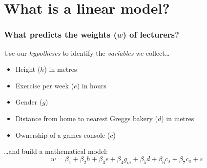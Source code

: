 \documentclass[aspectratio=43]{beamer}
\begin{document}
\section{What is a linear model?}


\frame
{\frametitle{What predicts the weights ($w$) of lecturers?}



Use our {\it hypotheses} to identify the {\it variables} we collect\ldots
\begin{itemize}

	\item Height ($h$) in metres
	\item Exercise per week ($e$) in hours
	\item Gender ($g$)
	\item Distance from home to nearest Greggs bakery ($d$) in metres
	\item Ownership of a games console ($c$)

\end{itemize}
\vspace{12pt}
\ldots and build a mathematical model:
\[w = \beta_1 + \beta_2 h + \beta_3 e + \beta_4 g_m  + \beta_5 d + \beta_6 c_s + \beta_7 c_a + \varepsilon\]
}
\end{document}
